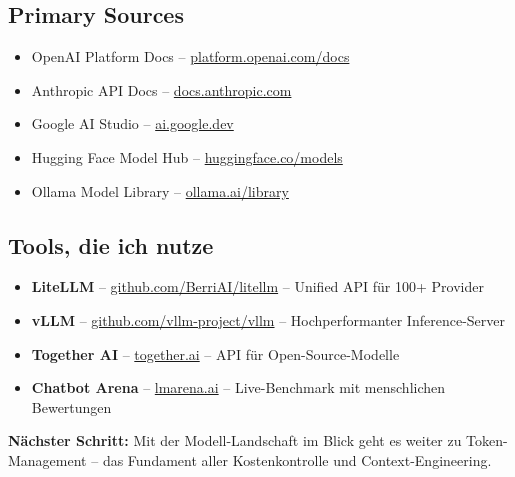 \subsection{Primary Sources}
\begin{itemize}[leftmargin=*]
    \item OpenAI Platform Docs -- \href{https://platform.openai.com/docs}{platform.openai.com/docs}
    \item Anthropic API Docs -- \href{https://docs.anthropic.com}{docs.anthropic.com}
    \item Google AI Studio -- \href{https://ai.google.dev}{ai.google.dev}
    \item Hugging Face Model Hub -- \href{https://huggingface.co/models}{huggingface.co/models}
    \item Ollama Model Library -- \href{https://ollama.ai/library}{ollama.ai/library}
\end{itemize}

\subsection{Tools, die ich nutze}
\begin{itemize}[leftmargin=*]
    \item \textbf{LiteLLM} -- \href{https://github.com/BerriAI/litellm}{github.com/BerriAI/litellm} -- Unified API für 100+ Provider
    \item \textbf{vLLM} -- \href{https://github.com/vllm-project/vllm}{github.com/vllm-project/vllm} -- Hochperformanter Inference-Server
    \item \textbf{Together AI} -- \href{https://together.ai}{together.ai} -- API für Open-Source-Modelle
    \item \textbf{Chatbot Arena} -- \href{https://lmarena.ai}{lmarena.ai} -- Live-Benchmark mit menschlichen Bewertungen
\end{itemize}


\textbf{Nächster Schritt:} Mit der Modell-Landschaft im Blick geht es weiter zu Token-Management -- das Fundament aller Kostenkontrolle und Context-Engineering.
\endinput

\clearpage
